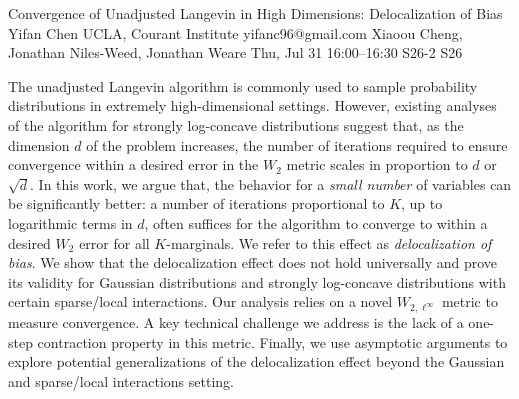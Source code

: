 \begin{talk}
\medskip


\end{talk}

\begin{talk}
  {Convergence of Unadjusted Langevin in High Dimensions: Delocalization of Bias}%
  {Yifan Chen}%
  {UCLA, Courant Institute}%
  {yifanc96@gmail.com}%
  {Xiaoou Cheng, Jonathan Niles-Weed, Jonathan Weare}%
  {}%
  {Thu, Jul 31 16:00--16:30}%
  {S26-2}%
  {S26}%
  
    
   
The unadjusted Langevin algorithm is commonly used to sample probability distributions in extremely high-dimensional settings. However, existing analyses of the algorithm for strongly log-concave distributions suggest that, as the dimension $d$ of the problem increases, the number of iterations required to ensure convergence within a desired error in the $W_2$ metric scales in proportion to $d$ or $\sqrt{d}$. In this work, we argue that, the behavior for a \emph{small number} of variables can be significantly better: a number of iterations proportional to $K$, up to logarithmic terms in $d$,
often suffices for the algorithm to converge to within a desired $W_2$ error for all $K$-marginals.
We refer to this effect as 
\textit{delocalization of bias}. 
We show that the delocalization effect does not hold universally and prove its validity for Gaussian distributions and strongly log-concave distributions with certain sparse/local interactions. Our analysis relies on a novel $W_{2,\ell^\infty}$ metric to measure convergence. A key technical challenge we address is the lack of a one-step contraction property in this metric. Finally, we use asymptotic arguments to explore potential generalizations of the delocalization effect beyond the Gaussian and sparse/local interactions setting.

\end{talk}

